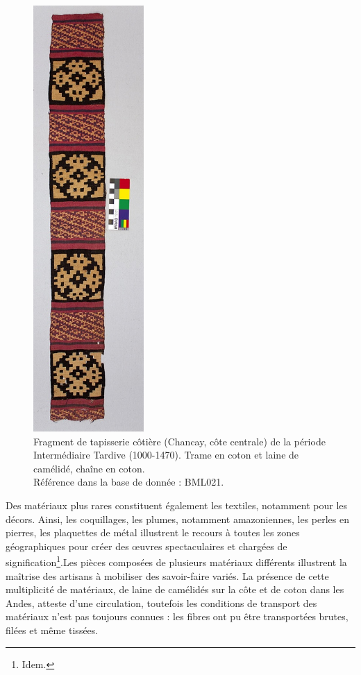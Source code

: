 \begin{figure}[!ht]
        \begin{center}
        		\includegraphics[width=4.2cm, angle=-90]{../images/BML021_IMG_3319.jpg}
	\end{center}
    \caption{Fragment de tapisserie côtière (Chancay, côte centrale) de la période Intermédiaire Tardive (1000-1470). Trame en coton et laine de camélidé, chaîne en coton. \\ Référence dans la base de donnée :  BML021.}     
    \label{fig:BML021}
\end{figure}

\noindent Des matériaux plus rares constituent également les textiles, notamment pour les décors. Ainsi, les coquillages, les plumes, notamment amazoniennes, les perles en pierres, les plaquettes de métal illustrent \og le recours à toutes les zones géographiques pour créer des \oe{}uvres spectaculaires et chargées de signification\footnote{Idem.}.\fg \:Les pièces composées de plusieurs matériaux différents illustrent la maîtrise des artisans à mobiliser des savoir-faire variés. La présence de cette multiplicité de matériaux, de laine de camélidés sur la côte et de coton dans les Andes, atteste d'une circulation, toutefois les conditions de transport des matériaux n'est pas toujours connues : les fibres ont pu être transportées brutes, filées et même tissées.\\

